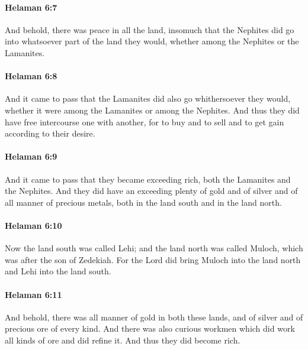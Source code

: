 		\paragraph{Helaman 6:7} %
			\label{HELAMAN-6-7}

			And behold, there was peace in all the land,
			insomuch that the Nephites did go into whatsoever part of the land they would,
			whether among the Nephites or the Lamanites.

		\paragraph{Helaman 6:8} %
			\label{HELAMAN-6-8}

			And it came to pass that the Lamanites did also go whithersoever they would,
			whether it were among the Lamanites or among the Nephites.
			And thus they did have free intercourse one with another,
			for to buy and to sell and to get gain according to their desire.

		\paragraph{Helaman 6:9} %
			\label{HELAMAN-6-9}

			And it came to pass that they became exceeding rich,
			both the Lamanites and the Nephites.
			And they did have an exceeding plenty of gold and of silver
			and of all manner of precious metals,
			both in the land south and in the land north.

		\paragraph{Helaman 6:10} %
			\label{HELAMAN-6-10}

			Now the land south was called Lehi;
			and the land north was called Muloch,
			which was after the son of Zedekiah.
			For the Lord did bring Muloch into the land north
			and Lehi into the land south.

		\paragraph{Helaman 6:11} %
			\label{HELAMAN-6-11}

			And behold, there was all manner of gold in both these lands,
			and of silver and of precious ore of every kind.
			And there was also curious workmen
			which did work all kinds of ore and did refine it.
			And thus they did become rich.

